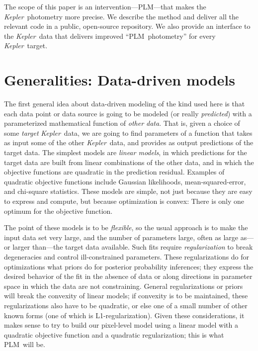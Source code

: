 \documentclass[12pt, preprint]{aastex}
\newcommand{\project}[1]{\textsl{#1}}
\newcommand{\Kepler}{\project{Kepler}}
\newcommand{\name}{PLM}
\begin{document}
The scope of this paper is an intervention---\name---that makes the \Kepler\ photometry more precise.
We describe the method and deliver all the relevant code in a public, open-source repository.
We also provide an interface to the \Kepler\ data that delivers improved ``\name\ photometry''
  for every \Kepler\ target.

\section{Generalities: Data-driven models}

The first general idea about data-driven modeling of the kind used here
  is that each data point or data source is going to be modeled
  (or really \emph{predicted})
  with a parameterized mathematical function of \emph{other data}.
That is, given a choice of some \emph{target} \Kepler\ data,
  we are going to find parameters of a function that takes as input some of the other \Kepler\ data,
  and provides as output predictions of the target data.
The simplest models are \emph{linear models},
  in which predictions for the target data are built from linear combinations of the other data,
  and in which the objective functions are quadratic in the prediction residual.
Examples of quadratic objective functions include Gaussian likelihoods, mean-squared-error, and chi-square statistics.
These models are simple,
  not just because they are easy to express and compute,
  but because optimization is convex:
There is only one optimum for the objective function.

The point of these models is to be \emph{flexible},
  so the usual approach is to make the input data set very large,
  and the number of parameters large,
  often as large as---or larger than---the target data available.
Such fits require \emph{regularization} to break degeneracies
  and control ill-constrained parameters.
These regularizations do for optimizations what priors do for posterior probability inferences;
  they express the desired behavior of the fit in the absence of data
  or along directions in parameter space in which the data are not constraining.
General regularizations or priors will break the convexity of linear models;
  if convexity is to be maintained, these regularizations also have to be quadratic,
  or else one of a small number of other known forms (one of which is L1-regularization).
Given these considerations, it makes sense to try to build our pixel-level model
  using a linear model with a quadratic objective function and a quadratic regularization;
  this is what \name\ will be.
\end{document}
